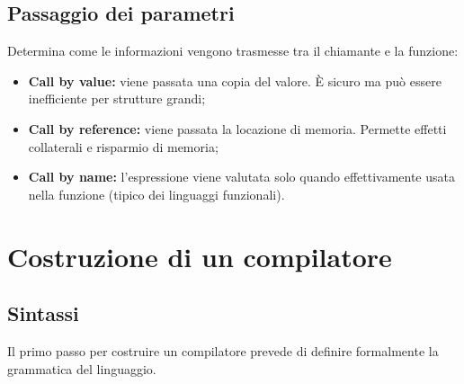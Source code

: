 \documentclass[12pt]{article}
\begin{document}
\subsection{Passaggio dei parametri}
Determina come le informazioni vengono trasmesse tra il chiamante e la funzione:
\begin{itemize}
    \item \textbf{Call by value:} viene passata una copia del valore. È sicuro ma può essere inefficiente per strutture grandi;
    \item \textbf{Call by reference:} viene passata la locazione di memoria. Permette effetti collaterali e risparmio di memoria;
    \item \textbf{Call by name:} l'espressione viene valutata solo quando effettivamente usata nella funzione (tipico dei linguaggi funzionali).
\end{itemize}

\newpage
\section{Costruzione di un compilatore}
\subsection{Sintassi}
Il primo passo per costruire un compilatore prevede di definire formalmente la grammatica del linguaggio.
\end{document}
